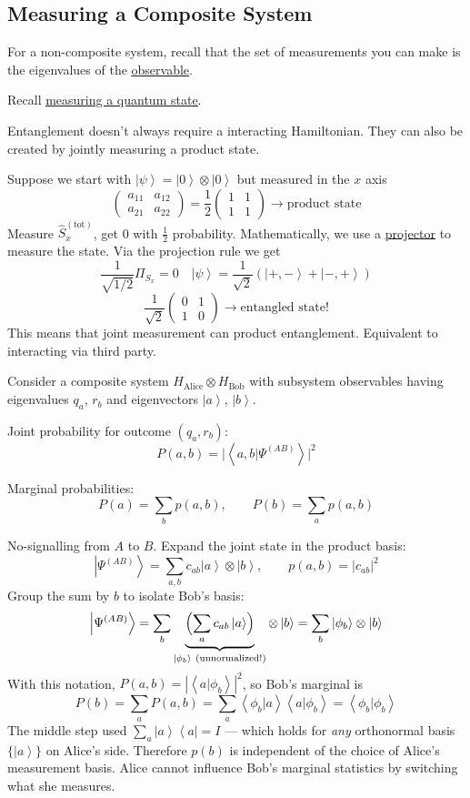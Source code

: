 \documentclass[
]{article}
\let\oldhyperref\hyperref
\renewcommand{\hyperref}[2][]{\oldhyperref[#1]{\underline{#2}}}
\providecommand{\ket}[1]{\left\lvert #1 \right\rangle}
\providecommand{\bra}[1]{\left\langle #1 \right\rvert}
\providecommand{\braket}[1]{\left\langle #1 \right\rangle}
\begin{document}
\subsection{Measuring a Composite System}\label{measuring-a-composite-system}
For a non-composite system, recall that the set of measurements you can make is the eigenvalues of the \hyperref[observables]{observable}.

Recall \hyperref[measuring-a-quantum-state]{measuring a quantum state}.

Entanglement doesn't always require a interacting Hamiltonian. They can also be created by jointly measuring a product state.

Suppose we start with $\ket{\psi} = \ket{0} \otimes \ket{0}$ but measured in the $x$ axis
\[
	\begin{pmatrix} a_{11} & a_{12} \\ a_{21} & a_{22} \end{pmatrix} = \frac{1}{2}\begin{pmatrix} 1 & 1 \\ 1 & 1 \end{pmatrix} \longrightarrow \text{product state}
\]
Measure $\hat{S}_x^{(\text{tot})}$, get 0 with $\frac{1}{2}$ probability. Mathematically, we use a \hyperref[projectors]{projector} to measure the state. Via the projection rule we get
\[
	\frac{1}{\sqrt{1/2}} \Pi_{S_x} = 0 \quad \ket{\psi} = \frac{1}{\sqrt{2}}\left(\ket{+,-} + \ket{-,+}\right)
\]
\[
	\frac{1}{\sqrt{2}}\begin{pmatrix} 0 & 1 \\ 1 & 0 \end{pmatrix} \longrightarrow \text{entangled state!}
\]
This means that joint measurement can product entanglement.
Equivalent to interacting via third party.

Consider a composite system $H_{\text{Alice}} \otimes H_{\text{Bob}}$ with subsystem observables having eigenvalues $q_a$, $r_b$ and eigenvectors $\ket{a}$, $\ket{b}$.

Joint probability for outcome $(q_a, r_b)$:
\[
	P(a, b) = \bigl|\braket{a, b | \Psi^{(AB)}}\bigr|^2
\]

Marginal probabilities:
\[
	P(a) = \sum_b p(a, b), \qquad P(b) = \sum_a p(a, b)
\]

No-signalling from $A$ to $B$. Expand the joint state in the product basis:
\[
	\ket{\Psi^{(AB)}} = \sum_{a,b} c_{ab} \ket{a} \otimes \ket{b}, \qquad p(a, b) = |c_{ab}|^2
\]
Group the sum by $b$ to isolate Bob's basis:
\[
	\ket{\Psi^{(AB)}} = \sum_b \underbrace{\Bigl(\sum_a c_{ab} \ket{a}\Bigr)}_{\ket{\phi_b} \ \text{(unnormalized!)}} \otimes \ket{b}
	= \sum_b \ket{\phi_b} \otimes \ket{b}
\]
With this notation, $P(a, b) = |\braket{a | \phi_b}|^2$, so Bob's marginal is
\[
	P(b) = \sum_a P(a, b) = \sum_a \braket{\phi_b | a} \braket{a | \phi_b} = \braket{\phi_b | \phi_b}
\]
The middle step used $\sum_a \ket{a}\bra{a} = I$ --- which holds for \emph{any} orthonormal basis $\{\ket{a}\}$ on Alice's side. Therefore $p(b)$ is independent of the choice of Alice's measurement basis. Alice cannot influence Bob's marginal statistics by switching what she measures.
\end{document}
